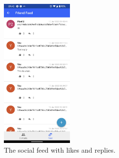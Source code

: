 \begin{figure}
    \centering
    \includegraphics[width=0.32\textwidth]{screens/superapp/feed}
    \caption{The social feed with likes and replies.}
    \label{manyverse}
\end{figure}










